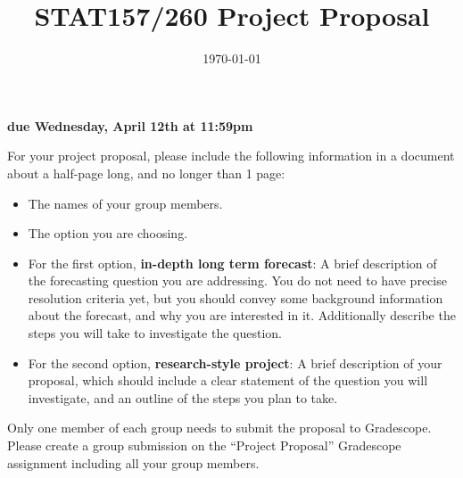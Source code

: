 \documentclass[11pt]{article}
\title{STAT157/260 Project Proposal}
\date{\today}
\begin{document}
\maketitle

\begin{flushright}
	\textbf{due Wednesday, April 12th at 11:59pm}
\end{flushright}

For your project proposal, please include the following information in a document about a half-page
long, and no longer than 1 page:
\begin{itemize}
	\item The names of your group members.
	\item The option you are choosing.
	\item For the first option, \textbf{in-depth long term forecast}: A brief description of the forecasting question you are addressing. You do not need to have precise resolution criteria yet, but you should convey some background information about the forecast, and why you are interested in it. Additionally describe the steps you will take to investigate the question.
	\item For the second option, \textbf{research-style project}: A brief description of your proposal, which should include a clear statement of the question you will investigate, and an outline of the steps you plan to take.
\end{itemize}

Only one member of each group needs to submit the proposal to Gradescope. Please create a group
submission on the “Project Proposal” Gradescope assignment including all your group members.
\end{document}
